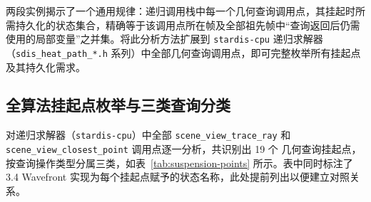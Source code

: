 两段实例揭示了一个通用规律：递归调用栈中每一个几何查询调用点，其挂起时所需持久化的状态集合，精确等于该调用点所在帧及全部祖先帧中“查询返回后仍需使用的局部变量”之并集。将此分析方法扩展到 \texttt{stardis-cpu} 递归求解器（\texttt{sdis\_heat\_path\_*.h} 系列）中全部几何查询调用点，即可完整枚举所有挂起点及其持久化需求。

\subsection{全算法挂起点枚举与三类查询分类}

对递归求解器（\texttt{stardis-cpu}）中全部 \texttt{scene\_view\_trace\_ray} 和 \texttt{scene\_view\_closest\_point} 调用点逐一分析，共识别出 19 个 几何查询挂起点，按查询操作类型分属三类，如表~\ref{tab:suspension-points} 所示。表中同时标注了 3.4 Wavefront 实现为每个挂起点赋予的状态名称，此处提前列出以便建立对照关系。

